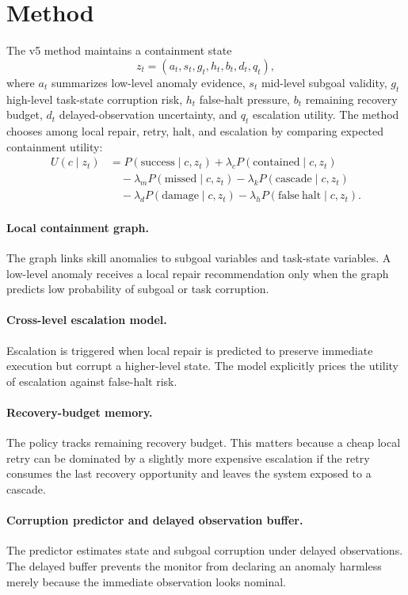 \documentclass{article}
\begin{document}
\section{Method}
The v5 method maintains a containment state
\[
z_t = (a_t, s_t, g_t, h_t, b_t, d_t, q_t),
\]
where $a_t$ summarizes low-level anomaly evidence, $s_t$ mid-level subgoal validity, $g_t$ high-level task-state corruption risk, $h_t$ false-halt pressure, $b_t$ remaining recovery budget, $d_t$ delayed-observation uncertainty, and $q_t$ escalation utility. The method chooses among local repair, retry, halt, and escalation by comparing expected containment utility:
\begin{align*}
U(c \mid z_t) &=
P(\mathrm{success}\mid c,z_t)
+ \lambda_c P(\mathrm{contained}\mid c,z_t) \\
&\quad - \lambda_m P(\mathrm{missed}\mid c,z_t)
- \lambda_k P(\mathrm{cascade}\mid c,z_t) \\
&\quad - \lambda_d P(\mathrm{damage}\mid c,z_t)
- \lambda_h P(\mathrm{false\ halt}\mid c,z_t).
\end{align*}

\paragraph{Local containment graph.}
The graph links skill anomalies to subgoal variables and task-state variables. A low-level anomaly receives a local repair recommendation only when the graph predicts low probability of subgoal or task corruption.

\paragraph{Cross-level escalation model.}
Escalation is triggered when local repair is predicted to preserve immediate execution but corrupt a higher-level state. The model explicitly prices the utility of escalation against false-halt risk.

\paragraph{Recovery-budget memory.}
The policy tracks remaining recovery budget. This matters because a cheap local retry can be dominated by a slightly more expensive escalation if the retry consumes the last recovery opportunity and leaves the system exposed to a cascade.

\paragraph{Corruption predictor and delayed observation buffer.}
The predictor estimates state and subgoal corruption under delayed observations. The delayed buffer prevents the monitor from declaring an anomaly harmless merely because the immediate observation looks nominal.
\end{document}
